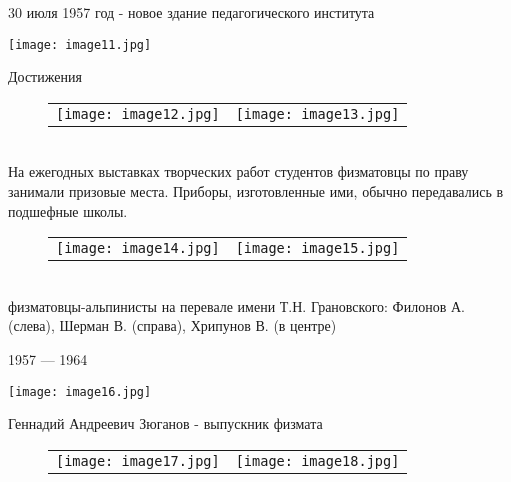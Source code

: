 \documentclass[pdf,hyperref={unicode}, aspectratio=43, serif,11pt]{beamer}
\begin{document}
\begin{frame}{30 июля 1957 год - новое здание педагогического института}
    \begin{center}
        \texttt{[image: image11.jpg]}
    \end{center}
\end{frame}
\begin{frame}{Достижения}
    \begin{figure}[h]
        \begin{tabular}{ll}
            \texttt{[image: image12.jpg]}
            &
            \texttt{[image: image13.jpg]}
        \end{tabular}
        \label{Fig:Race}
    \end{figure} \\
    На ежегодных выставках творческих работ студентов физматовцы по праву занимали призовые места. Приборы, изготовленные ими, обычно передавались в подшефные школы.
\end{frame}
\begin{frame}
    \begin{figure}[h]
        \begin{tabular}{ll}
            \texttt{[image: image14.jpg]}
            &
            \texttt{[image: image15.jpg]}
        \end{tabular}
        \label{Fig:Race}
    \end{figure} \\
    физматовцы-альпинисты на перевале имени Т.Н. Грановского: Филонов А. (слева), Шерман В. (справа), Хрипунов В. (в центре)
\end{frame}
\begin{frame}{1957 — 1964}
    \begin{center}
        \texttt{[image: image16.jpg]} \\
        \caption{Александров Василий Александрович - декан физмата}
    \end{center}
\end{frame}
\begin{frame}{Геннадий Андреевич Зюганов - выпускник физмата}
    \begin{figure}[h]
        \begin{tabular}{ll}
            \texttt{[image: image17.jpg]}
            &
            \texttt{[image: image18.jpg]}
        \end{tabular}
        \label{Fig:Race}
    \end{figure}
\end{frame}
\end{document}
